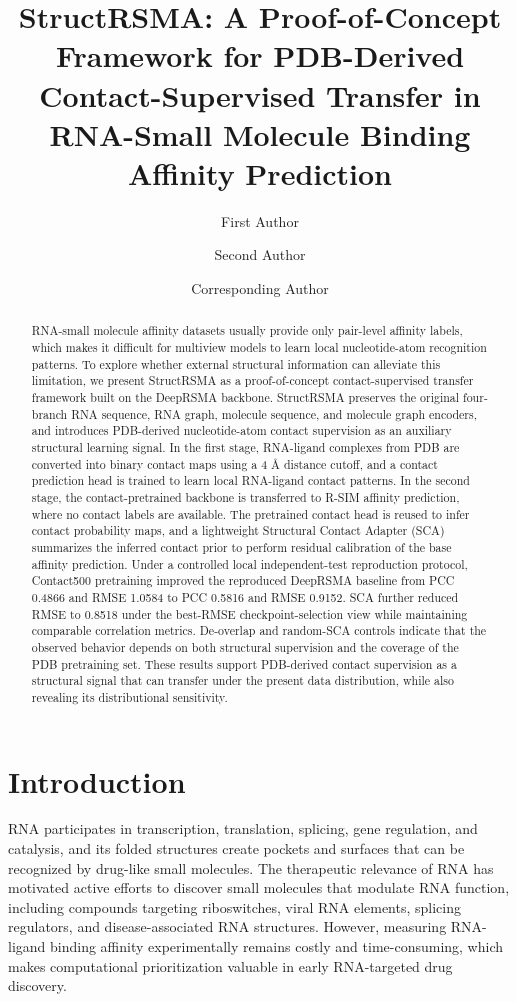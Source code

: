 ﻿\documentclass[journal=jcisd8,manuscript=article]{achemso}
\title{StructRSMA: A Proof-of-Concept Framework for PDB-Derived Contact-Supervised Transfer in RNA-Small Molecule Binding Affinity Prediction}
\author{First Author}
\affiliation{Department of Bioinformatics, Placeholder University, Placeholder City, Placeholder Country}
\author{Second Author}
\affiliation{Department of Pharmaceutical Sciences, Placeholder University, Placeholder City, Placeholder Country}
\author{Corresponding Author}
\affiliation{Department of Bioinformatics, Placeholder University, Placeholder City, Placeholder Country}
\begin{document}
\begin{abstract}
RNA-small molecule affinity datasets usually provide only pair-level affinity labels, which makes it difficult for multiview models to learn local nucleotide-atom recognition patterns. To explore whether external structural information can alleviate this limitation, we present StructRSMA as a proof-of-concept contact-supervised transfer framework built on the DeepRSMA backbone. StructRSMA preserves the original four-branch RNA sequence, RNA graph, molecule sequence, and molecule graph encoders, and introduces PDB-derived nucleotide-atom contact supervision as an auxiliary structural learning signal. In the first stage, RNA-ligand complexes from PDB are converted into binary contact maps using a 4 \AA{} distance cutoff, and a contact prediction head is trained to learn local RNA-ligand contact patterns. In the second stage, the contact-pretrained backbone is transferred to R-SIM affinity prediction, where no contact labels are available. The pretrained contact head is reused to infer contact probability maps, and a lightweight Structural Contact Adapter (SCA) summarizes the inferred contact prior to perform residual calibration of the base affinity prediction. Under a controlled local independent-test reproduction protocol, Contact500 pretraining improved the reproduced DeepRSMA baseline from PCC 0.4866 and RMSE 1.0584 to PCC 0.5816 and RMSE 0.9152. SCA further reduced RMSE to 0.8518 under the best-RMSE checkpoint-selection view while maintaining comparable correlation metrics. De-overlap and random-SCA controls indicate that the observed behavior depends on both structural supervision and the coverage of the PDB pretraining set. These results support PDB-derived contact supervision as a structural signal that can transfer under the present data distribution, while also revealing its distributional sensitivity.
\end{abstract}

\section{Introduction}

RNA participates in transcription, translation, splicing, gene regulation, and catalysis, and its folded structures create pockets and surfaces that can be recognized by drug-like small molecules.\cite{Caprara2000RNA,ChildsDisney2022TargetingRNA,Warner2018Principles} The therapeutic relevance of RNA has motivated active efforts to discover small molecules that modulate RNA function, including compounds targeting riboswitches, viral RNA elements, splicing regulators, and disease-associated RNA structures.\cite{Costales2020How,Yu2020RNADrugs} However, measuring RNA-ligand binding affinity experimentally remains costly and time-consuming, which makes computational prioritization valuable in early RNA-targeted drug discovery.\cite{Kairys2019BindingAffinity}
\end{document}
